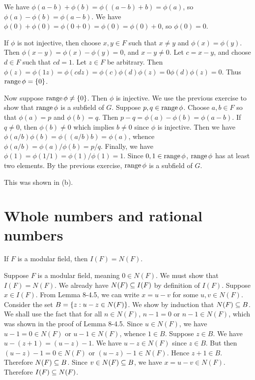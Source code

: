 \begin{solution}
\begin{enumalpha}
    \item We have $\phi(a-b)+\phi(b)=\phi((a-b)+b)=\phi(a)$, so $\phi(a)-\phi(b) = \phi(a-b)$.
    We have $\phi(0)+\phi(0)=\phi(0+0)=\phi(0)=\phi(0)+0$, so $\phi(0)=0$.
    
    \item If $\phi$ is not injective, then choose $x,y\in F$ such that $x\neq y$ and
    $\phi(x)=\phi(y)$. Then $\phi(x-y)=\phi(x)-\phi(y)=0$, and $x-y\neq 0$.
    Let $c=x-y$, and choose $d\in F$ such that $cd=1$.
    Let $z\in F$ be arbitrary. Then $\phi(z)=\phi(1z)=\phi(cdz)=\phi(c)\phi(d)\phi(z)=0\phi(d)\phi(z)=0$.
    Thus $\operatorname{range}\phi=\left\{0\right\}$.
    
    Now suppose $\operatorname{range}\phi\neq\left\{0\right\}$. Then $\phi$ is injective. We use the previous exercise
    to show that $\operatorname{range}\phi$ is a subfield of $G$.
    Suppose $p,q\in\operatorname{range}\phi$. Choose $a,b\in F$ so that $\phi(a)=p$ and
    $\phi(b)=q$. Then $p-q=\phi(a)-\phi(b)=\phi(a-b)$.
    If $q\neq 0$, then $\phi(b)\neq 0$
    which implies $b\neq 0$ since $\phi$ is injective.
    Then we have $\phi(a/b)\phi(b)=\phi((a/b)b)=\phi(a)$,
    whence $\phi(a/b)=\phi(a)/\phi(b)=p/q$. 
    Finally, we have $\phi(1)=\phi(1/1)=\phi(1)/\phi(1)=1$. Since $0,1\in\operatorname{range}\phi$, $\operatorname{range}\phi$ has
    at least two elements.
    By the previous exercise, $\operatorname{range}\phi$ is a subfield of $G$.

    \item This was shown in (b).
\end{enumalpha}
\end{solution}

\section{Whole numbers and rational numbers}
\begin{exercise}
If $F$ is a modular field, then $I(F) = N(F)$.
\end{exercise}

\begin{solution}
Suppose $F$ is a modular field, meaning $0\in N(F)$.
We must show that $I(F)=N(F)$. We already have $N(F)\subseteq I(F)$ by definition of $I(F)$.
Suppose $x\in I(F)$.
From Lemma 8-4.5, we can write $x=u-v$ for some $u,v\in N(F)$.
Consider the set $B=\left\{ z : u-z\in N(F) \right\}$. We show by induction that $N(F)\subseteq B$.
We shall use the fact that for all $n\in N(F)$, $n-1=0$ or $n-1\in N(F)$, which was shown
in the proof of Lemma 8-4.5.
Since $u\in N(F)$, we have $u-1=0\in N(F)$ or $u-1\in N(F)$, whence $1\in B$.
Suppose $z\in B$.
We have $u-(z+1)=(u-z)-1$. We have $u-z\in N(F)$ since $z\in B$.
But then $(u-z)-1=0\in N(F)$ or $(u-z)-1\in N(F)$. Hence $z+1\in B$.
Therefore $N(F)\subseteq B$.
Since $v\in N(F)\subseteq B$, we have $x=u-v\in N(F)$.
Therefore $I(F)\subseteq N(F)$.
\end{solution}

